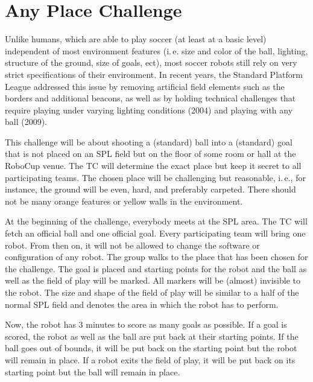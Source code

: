 \documentclass[12pt]{article}
\newcommand{\ie}{\mbox{i.\,e.}\xspace}
\begin{document}
\newpage






\section{Any Place Challenge}

Unlike humans, which are able to play soccer (at least at a basic level) independent of most environment features (\ie size and color of the ball, lighting, structure of the ground, size of goals, ect), most soccer robots still rely on very strict specifications of their environment. In recent years, the Standard Platform League addressed this issue by removing artificial field elements such as the borders and additional beacons, as well as by holding technical challenges that require playing under varying lighting conditions (2004) and playing with any ball (2009).

This challenge will be about shooting a (standard) ball into a (standard) goal that is not placed on an SPL field but on the floor of some room or hall at the RoboCup venue. The TC will determine the exact place but keep it secret to all participating teams. The chosen place will be challenging but reasonable, \ie, for instance, the ground will be even, hard, and preferably carpeted. There should not be many orange features or yellow walls in the environment.

At the beginning of the challenge, everybody meets at the SPL area. The TC will fetch an official ball and one official goal. Every participating team will bring one robot. From then on, it will not be allowed to change the software or configuration of any robot. The group walks to the place that has been chosen for the challenge. The goal is placed and starting points for the robot and the ball as well as the field of play will be marked. All markers will be (almost) invisible to the robot. The size and shape of the field of play will be similar to a half of the normal SPL field and denotes the area in which the robot has to perform.

Now, the robot has 3 minutes to score as many goals as possible. If a goal is scored, the robot as well as the ball are put back at their starting points. If the ball goes out of bounds, it will be put back on the starting point but the robot will remain in place. If a robot exits the field of play, it will be put back on its starting point but the ball will remain in place.
\end{document}
